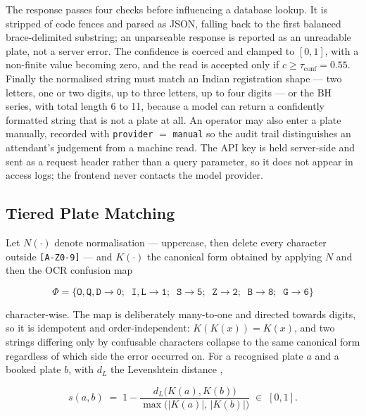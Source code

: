 \documentclass[journal,onecolumn,11pt]{IEEEtran}
\begin{document}
The response passes four checks before influencing a database lookup. It is
stripped of code fences and parsed as JSON, falling back to the first balanced
brace-delimited substring; an unparseable response is reported as an unreadable
plate, not a server error. The confidence is coerced and clamped to $[0,1]$,
with a non-finite value becoming zero, and the read is accepted only if
$c \geq \tau_{\text{conf}} = 0.55$. Finally the normalised string must match an
Indian registration shape --- two letters, one or two digits, up to three
letters, up to four digits --- or the BH series, with total length 6 to 11,
because a model can return a confidently formatted string that is not a plate
at all. An operator may also enter a plate manually, recorded with
\texttt{provider} $=$ \texttt{manual} so the audit trail distinguishes an
attendant's judgement from a machine read. The API key is held server-side and
sent as a request header rather than a query parameter, so it does not appear
in access logs; the frontend never contacts the model provider.

\subsection{Tiered Plate Matching}
\label{sec:plate}

Let $N(\cdot)$ denote normalisation --- uppercase, then delete every character
outside \texttt{[A-Z0-9]} --- and $K(\cdot)$ the canonical form obtained by
applying $N$ and then the OCR confusion map

\begin{equation}
  \Phi = \{\texttt{O},\texttt{Q},\texttt{D}\!\to\!\texttt{0};\;\;
           \texttt{I},\texttt{L}\!\to\!\texttt{1};\;\;
           \texttt{S}\!\to\!\texttt{5};\;\;
           \texttt{Z}\!\to\!\texttt{2};\;\;
           \texttt{B}\!\to\!\texttt{8};\;\;
           \texttt{G}\!\to\!\texttt{6}\}
  \label{eq:confusion}
\end{equation}

character-wise. The map is deliberately many-to-one and directed towards
digits, so it is idempotent and order-independent: $K(K(x)) = K(x)$, and two
strings differing only by confusable characters collapse to the same canonical
form regardless of which side the error occurred on. For a recognised plate $a$
and a booked plate $b$, with $d_L$ the Levenshtein distance
\cite{levenshtein1966},

\begin{equation}
  s(a,b) \;=\; 1 - \frac{d_L\bigl(K(a), K(b)\bigr)}
                       {\max\bigl(|K(a)|,\, |K(b)|\bigr)} \;\in\; [0,1].
  \label{eq:similarity}
\end{equation}
\end{document}
